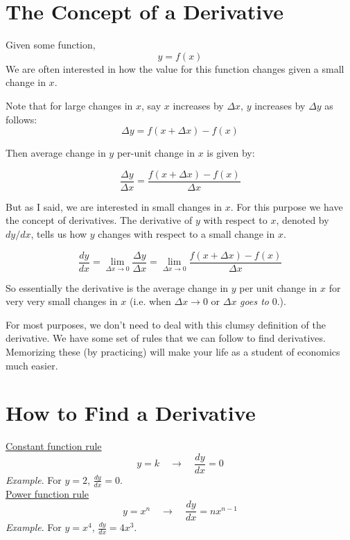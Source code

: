\documentclass{./../../Latex/handout}
\begin{document}
\thispagestyle{plain}
\newcommand{\mytitle}{Reviewing Calculus}
\myheader{\mytitle}
\section{The Concept of a Derivative}

Given some function, 
$$ y = f(x) $$
We are often interested in how the value for this function changes given a small change in $x$. 

Note that for large changes in $x$, say $x$ increases by $\Delta x$, $y$ increases by $\Delta y$ as follows:
$$ \Delta y =  f(x+\Delta x) - f(x) $$

Then average change in $y$ per-unit change in $x$ is given by:

$$ \frac{\Delta y}{\Delta x} =  \frac{f(x+\Delta x) - f(x)}{\Delta x} $$

But as I said, we are interested in small changes in $x$. For this purpose we have the concept of derivatives. The derivative of $y$ with respect to $x$, denoted by $d y/ d x$, tells us how $y$ changes with respect to a small change in $x$. 

$$  \frac{d y}{d x}= \lim_{\Delta x \rightarrow 0}  \frac{\Delta y}{\Delta x} =  \lim_{\Delta x \rightarrow 0}  \frac{f(x+\Delta x) - f(x)}{\Delta x} $$

So essentially the derivative is the average change in $y$ per unit change in $x$ for very very small changes in $x$ (i.e. when $\Delta x \rightarrow 0$ or $\Delta x$ \textit{goes to} 0.). 

For most purposes, we don't need to deal with this clumsy definition of the derivative. We have some set of rules that we can follow to find derivatives. Memorizing these (by practicing) will make your life as a student of economics much easier. 

\section{How to Find a Derivative}

\underline{Constant function rule}
$$ y=k \quad \rightarrow \quad \frac{d y}{d x}=0 $$
\textit{\textit{Example}}. For $y=2$, $\frac{d y}{d x}=0 $. \\

\underline{Power function rule}
$$ y=x^{n} \quad \rightarrow \quad \frac{d y}{d x}=n x^{n-1} $$
\textit{\textit{Example}}. For $y=x^{4}$, $ \frac{d y}{d x}=4 x^3 $.\\
\end{document}
